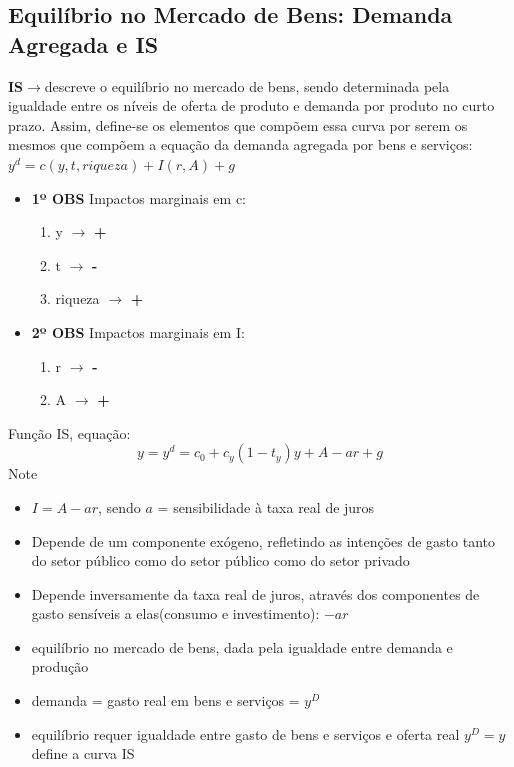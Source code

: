 \documentclass[a4paper,12pt]{article}[abntex2]
\begin{document}
\subsection{\textbf{Equilíbrio no Mercado de Bens: Demanda Agregada e IS}}
\textbf{IS}$\rightarrow$descreve o equilíbrio no mercado de bens, sendo determinada pela igualdade entre os níveis de  oferta de  produto e  demanda  por  produto  no  curto  prazo. Assim,  define-se  os elementos que  compõem  essa  curva  por  serem os mesmos  que  compõem a  equação da demanda agregada por bens e serviços: $y^d=c(y,t,riqueza)+I(r,A)+g$\begin{itemize}
    \item \textbf{1º OBS} Impactos marginais em c:\begin{enumerate}
        \item y $\rightarrow$ \textbf{+}
        \item t $\rightarrow$ \textbf{-}
        \item riqueza $\rightarrow$ \textbf{+}
    \end{enumerate} 
    \item \textbf{2º OBS} Impactos marginais em I:\begin{enumerate}
        \item r $\rightarrow$ \textbf{-}
        \item A $\rightarrow$ \textbf{+}
    \end{enumerate} 
\end{itemize}

Função IS, equação:
$$y=y^d=c_0+c_y(1-t_y)y+A-ar+g$$
Note \begin{itemize}
    \item $I = A-ar$, sendo $a$ = sensibilidade à taxa real de juros
    \item Depende de um componente exógeno, refletindo as intenções de gasto tanto do setor público como do setor público como do setor privado
    \item Depende inversamente da taxa real de juros, através dos componentes de gasto sensíveis a elas(consumo e investimento): $-ar$
    \item equilíbrio no mercado de bens, dada pela igualdade entre demanda e produção 
    \item demanda = gasto real  em bens e serviços = $y^D$
    \item equilíbrio requer igualdade entre gasto  de bens e serviços e oferta real $y^D=y$ define a curva IS 
\end{itemize}
\end{document}
